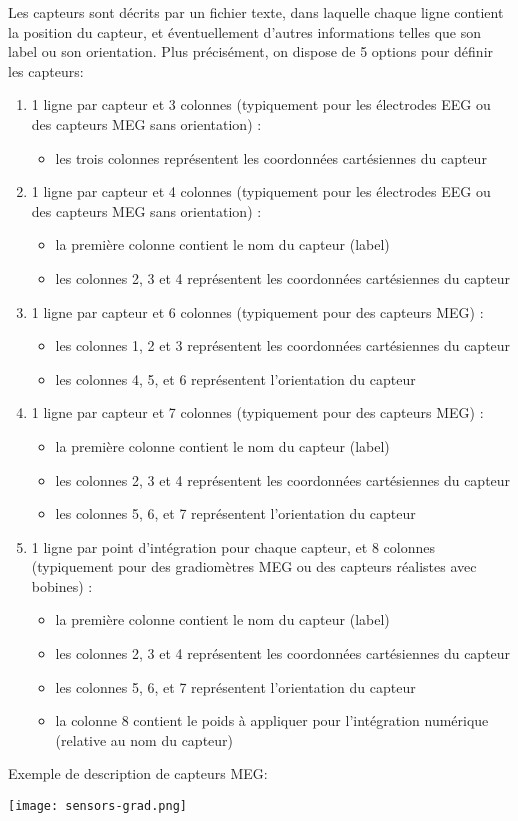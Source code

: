 \noindent
Les capteurs sont décrits par un fichier texte, dans laquelle chaque ligne contient la position du capteur,
et éventuellement d'autres informations telles que son label ou son orientation. Plus précisément, on dispose de 5 options pour définir les capteurs:
\begin{enumerate}
\item  1 ligne par capteur et 3 colonnes (typiquement pour les électrodes EEG ou des capteurs MEG sans orientation) :
	\begin{itemize}
		\item  les trois colonnes représentent les coordonnées cartésiennes du capteur
	\end{itemize}
\item  1 ligne par capteur et 4 colonnes (typiquement pour les électrodes EEG ou des capteurs MEG sans orientation) :
	\begin{itemize}
		\item   la première colonne contient le nom du capteur (label)
		\item les colonnes 2, 3 et 4  représentent les coordonnées cartésiennes du capteur
	\end{itemize}
\item 1 ligne par capteur et 6 colonnes (typiquement pour des capteurs MEG) :
	\begin{itemize}
		\item  les colonnes 1, 2  et 3  représentent les coordonnées cartésiennes du capteur
		\item  les colonnes 4, 5, et 6 représentent l'orientation du capteur
	\end{itemize}
\item  1 ligne par capteur et 7 colonnes (typiquement pour des capteurs MEG) :
	\begin{itemize}
		\item la première colonne contient le nom du capteur (label)
		\item les colonnes 2, 3  et 4  représentent les coordonnées cartésiennes du capteur
		\item les colonnes 5, 6, et 7 représentent l'orientation du capteur
	\end{itemize}
\item 1 ligne par point d'intégration pour chaque capteur, et 8 colonnes (typiquement pour des gradiomètres MEG ou des capteurs réalistes avec bobines) :
	\begin{itemize}
		\item  la première colonne contient le nom du capteur (label)
		\item les colonnes 2, 3  et 4  représentent les coordonnées cartésiennes du capteur
		\item  les colonnes 5, 6, et 7 représentent l'orientation du capteur
		\item  la colonne 8 contient le poids à appliquer pour l'intégration numérique (relative au nom du capteur)
	\end{itemize}

\end{enumerate}

Exemple de description de capteurs MEG:


\centerline{\texttt{[image: sensors-grad.png]}}

